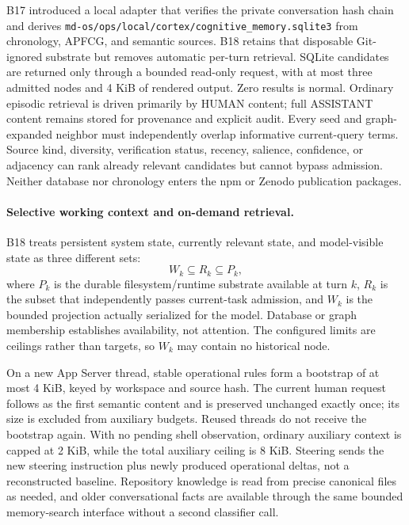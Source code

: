 \documentclass[10pt,twocolumn]{article}
\theoremstyle{definition}
\theoremstyle{plain}
\theoremstyle{remark}
\newcommand{\file}[1]{\nolinkurl{#1}}
\begin{document}
B17 introduced a local adapter that verifies the private conversation hash chain and derives \file{md-os/ops/local/cortex/cognitive\_memory.sqlite3} from chronology, APFCG, and semantic sources.  B18 retains that disposable Git-ignored substrate but removes automatic per-turn retrieval.  SQLite candidates are returned only through a bounded read-only request, with at most three admitted nodes and 4 KiB of rendered output.  Zero results is normal.  Ordinary episodic retrieval is driven primarily by HUMAN content; full ASSISTANT content remains stored for provenance and explicit audit.  Every seed and graph-expanded neighbor must independently overlap informative current-query terms.  Source kind, diversity, verification status, recency, salience, confidence, or adjacency can rank already relevant candidates but cannot bypass admission.  Neither database nor chronology enters the npm or Zenodo publication packages.

\paragraph{Selective working context and on-demand retrieval.}
\label{sec:selective-context}
B18 treats persistent system state, currently relevant state, and model-visible state as three different sets:
\begin{equation}
W_k \subseteq R_k \subseteq P_k,
\end{equation}
where $P_k$ is the durable filesystem/runtime substrate available at turn $k$, $R_k$ is the subset that independently passes current-task admission, and $W_k$ is the bounded projection actually serialized for the model.  Database or graph membership establishes availability, not attention.  The configured limits are ceilings rather than targets, so $W_k$ may contain no historical node.

On a new App Server thread, stable operational rules form a bootstrap of at most 4 KiB, keyed by workspace and source hash.  The current human request follows as the first semantic content and is preserved unchanged exactly once; its size is excluded from auxiliary budgets.  Reused threads do not receive the bootstrap again.  With no pending shell observation, ordinary auxiliary context is capped at 2 KiB, while the total auxiliary ceiling is 8 KiB.  Steering sends the new steering instruction plus newly produced operational deltas, not a reconstructed baseline.  Repository knowledge is read from precise canonical files as needed, and older conversational facts are available through the same bounded memory-search interface without a second classifier call.
\end{document}
